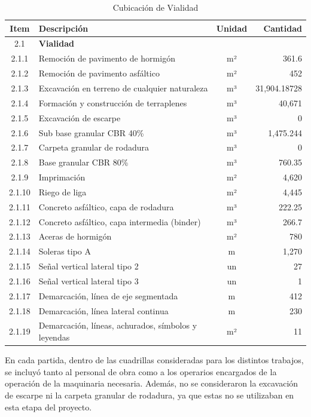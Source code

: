 \documentclass{article} %
\begin{document}
\begin{table}[h!]
    \centering
    \begin{tabular}{|c|l|c|r|}
    \hline
    \textbf{Item} & \textbf{Descripción} & \textbf{Unidad} & \textbf{Cantidad} \\ \hline
    2.1 & \textbf{Vialidad} & & \\ \hline
    2.1.1 & Remoción de pavimento de hormigón & m² & 361.6 \\ \hline
    2.1.2 & Remoción de pavimento asfáltico & m² & 452 \\ \hline
    2.1.3 & Excavación en terreno de cualquier naturaleza & m³ & 31,904.18728 \\ \hline
    2.1.4 & Formación y construcción de terraplenes & m³ & 40,671 \\ \hline
    2.1.5 & Excavación de escarpe & m³ & 0 \\ \hline
    2.1.6 & Sub base granular CBR 40\% & m³ & 1,475.244 \\ \hline
    2.1.7 & Carpeta granular de rodadura & m³ & 0 \\ \hline
    2.1.8 & Base granular CBR 80\% & m³ & 760.35 \\ \hline
    2.1.9 & Imprimación & m² & 4,620 \\ \hline
    2.1.10 & Riego de liga & m² & 4,445 \\ \hline
    2.1.11 & Concreto asfáltico, capa de rodadura & m³ & 222.25 \\ \hline
    2.1.12 & Concreto asfáltico, capa intermedia (binder) & m³ & 266.7 \\ \hline
    2.1.13 & Aceras de hormigón & m² & 780 \\ \hline
    2.1.14 & Soleras tipo A & m & 1,270 \\ \hline
    2.1.15 & Señal vertical lateral tipo 2 & un & 27 \\ \hline
    2.1.16 & Señal vertical lateral tipo 3 & un & 1 \\ \hline
    2.1.17 & Demarcación, línea de eje segmentada & m & 412 \\ \hline
    2.1.18 & Demarcación, línea lateral continua & m & 230 \\ \hline
    2.1.19 & Demarcación, líneas, achurados, símbolos y leyendas & m² & 11 \\ \hline
    \end{tabular}
    \caption{Cubicación de Vialidad}
\end{table}

En cada partida, dentro de las cuadrillas consideradas para los distintos trabajos, se incluyó tanto al personal de obra como a los operarios encargados de la operación de la maquinaria necesaria. Además, no se consideraron la excavación de escarpe ni la carpeta granular de rodadura, ya que estas no se utilizaban en esta etapa del proyecto.
\end{document}

